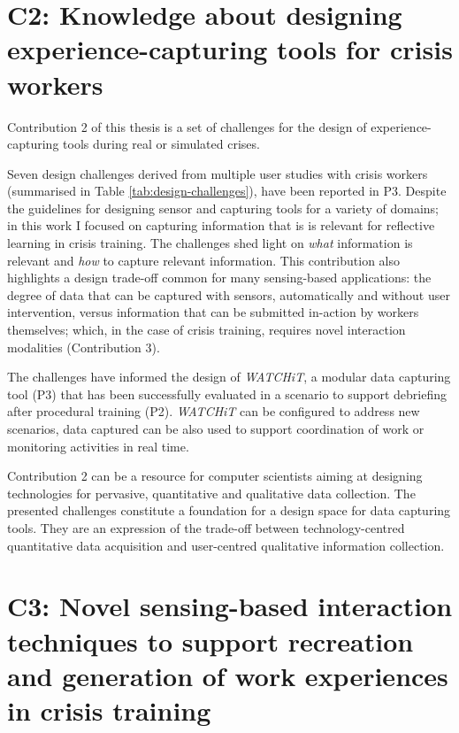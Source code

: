 \section{C2: Knowledge about designing experience-capturing tools for crisis workers}\label{c2-knowledge-about-designing-experience-capturing-tools-for-crisis-workers}

Contribution 2 of this thesis is a set of challenges for the design of experience-capturing tools during real or simulated crises.

Seven design challenges derived from multiple user studies with crisis workers (summarised in Table \ref{tab:design-challenges}), have been reported in P3. Despite the guidelines for designing sensor and capturing tools for a variety of domains; in this work I focused on capturing information that is is relevant for reflective learning in crisis training. The challenges shed light on \emph{what} information is relevant and \emph{how} to capture relevant information. This contribution also highlights a design trade-off common for many sensing-based applications: the degree of data that can be captured with sensors, automatically and without user intervention, versus information that can be submitted in-action by workers themselves; which, in the case of crisis training, requires novel interaction modalities (Contribution 3). 

The challenges have informed the design of \emph{WATCHiT}, a modular data capturing tool (P3) that has been successfully evaluated in a scenario to support debriefing after procedural training (P2). \emph{WATCHiT} can be configured to address new scenarios, data captured can be also used to support coordination of work or monitoring activities in real time.

Contribution 2 can be a resource for computer scientists aiming at designing technologies for pervasive, quantitative and qualitative data collection. The presented challenges constitute a foundation for a design space for data capturing tools. They are an expression of the trade-off between technology-centred quantitative data acquisition and user-centred qualitative information collection.

\section{C3: Novel sensing-based interaction techniques to support recreation and generation of work experiences in crisis training}\label{c3-novel-sensing-based-interaction-techniques-to-support-recreation-and-generation-of-work-experiences-in-crisis-training}

